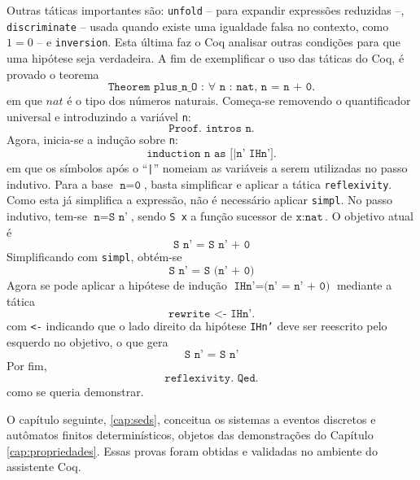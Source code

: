 Outras táticas importantes são: \texttt{unfold} -- para expandir expressões reduzidas --, \texttt{discriminate} -- usada quando existe uma igualdade falsa no contexto, como $1 = 0$ -- e \texttt{inversion}. Esta última faz o Coq analisar outras condições para que uma hipótese seja verdadeira. A fim de exemplificar o uso das táticas do Coq, é provado o teorema $$\texttt{Theorem plus\_n\_O : $\forall$ n : nat, n = n + 0.}$$ em que $nat$ é o tipo dos números naturais. Começa-se removendo o quantificador universal e introduzindo a variável \texttt{n}: $$\texttt{Proof. intros n.}$$ Agora, inicia-se a indução sobre \texttt{n}: $$\texttt{induction n as [|n' IHn'].}$$ em que os símbolos após o ``\texttt{|}'' nomeiam as variáveis a serem utilizadas no passo indutivo. Para a base $\texttt{n} = \texttt{0}$, basta simplificar e aplicar a tática \texttt{reflexivity}. Como esta já simplifica a expressão, não é necessário aplicar \texttt{simpl}. No passo indutivo, tem-se $\texttt{n} = \texttt{S n'}$, sendo \texttt{S x} a função sucessor de $\texttt{x} : \texttt{nat}$. O objetivo atual é $$\texttt{S n' = S n' + 0}$$ Simplificando com \texttt{simpl}, obtém-se $$\texttt{S n' = S (n' + 0)}$$ Agora se pode aplicar a hipótese de indução $\texttt{IHn'} = \texttt{(n' = n' + 0)}$ mediante a tática $$\texttt{rewrite <- IHn'.}$$ com \texttt{<-} indicando que o lado direito da hipótese \texttt{IHn'} deve ser reescrito pelo esquerdo no objetivo, o que gera $$\texttt{S n' = S n'}$$ Por fim, $$\texttt{reflexivity. Qed.}$$ como se queria demonstrar.

O capítulo seguinte, \ref{cap:seds}, conceitua os sistemas a eventos discretos e autômatos finitos determinísticos, objetos das demonstrações do Capítulo \ref{cap:propriedades}. Essas provas foram obtidas e validadas no ambiente do assistente Coq.